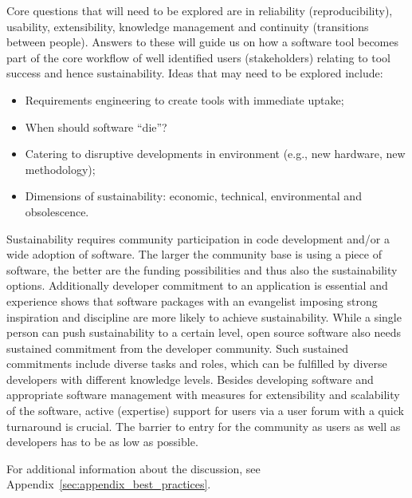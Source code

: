 Core questions that will need to be explored are in reliability (reproducibility), usability, extensibility, knowledge management and continuity (transitions between people). Answers to these will guide us on how a software tool becomes part of the core workflow of well identified users (stakeholders) relating to tool success and hence sustainability. 
Ideas  that may need to be explored include:
\begin{itemize}
\item Requirements engineering to create tools with immediate uptake;
\item When should software ``die''?
\item Catering to disruptive developments in environment (e.g., new hardware, new methodology);
\item Dimensions of sustainability: economic, technical, environmental and
obsolescence. 
\end{itemize}

Sustainability requires community participation in code development and/or a wide adoption of software.
The larger the community base is using a piece of software, the better are the funding possibilities and thus also the sustainability options.
Additionally developer commitment to an application is essential and experience shows that software packages with an evangelist imposing strong inspiration and discipline are more likely to achieve sustainability.
While a single person can push sustainability to a certain level, open source software also needs sustained commitment from the developer community.
Such sustained commitments include diverse tasks and roles, which can be fulfilled by diverse developers with different knowledge levels.
Besides developing software and appropriate software management with measures for extensibility and scalability of the software, active (expertise) support for users via a user forum with a quick turnaround is crucial.
The barrier to entry for the community as users as well as developers has to be as low as possible.

For additional information about the discussion, see Appendix~\ref{sec:appendix_best_practices}.

